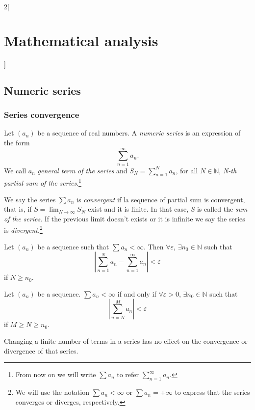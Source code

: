 \documentclass[class=article,crop=false]{standalone}
\begin{document}
\begin{multicols}{2}[\section{Mathematical analysis}]
\subsection{Numeric series}
\subsubsection{Series convergence}
\begin{definition}
Let $(a_n)$ be a sequence of real numbers. A \textit{numeric series} is an expression of the form $$\sum_{n=1}^\infty a_n.$$ We call $a_n$ \textit{general term of the series} and $\displaystyle S_N=\sum_{n=1}^N a_n$, for all $N\in\mathbb{N}$, \textit{N-th partial sum of the series}.\footnote{From now on we will write $\sum a_n$ to refer $\displaystyle\sum_{n=1}^\infty a_n$.}
\end{definition}
\begin{definition}
We say the series $\sum a_n$ is \textit{convergent} if la sequence of partial sum is convergent, that is, if $\displaystyle S=\lim_{N\to\infty}S_N$ exist and it is finite. In that case, $S$ is called the \textit{sum of the series}. If the previous limit doesn't exists or it is infinite we say the series is \textit{divergent}.\footnote{We will use the notation $\sum a_n<\infty$ or $\sum a_n=+\infty$ to express that the series converges or diverges, respectively.}
\end{definition}
\begin{prop}
Let $(a_n)$ be a sequence such that $\sum a_n<\infty$. Then $\forall\varepsilon$, $\exists n_0\in\mathbb{N}$ such that $$\left|\sum_{n=1}^N a_n-\sum_{n=1}^\infty a_n\right|<\varepsilon$$ if $N\geq n_0$.
\end{prop}
\begin{theorem}
Let $(a_n)$ be a sequence. $\sum a_n<\infty$ if and only if $\forall\varepsilon>0$, $\exists n_0\in\mathbb{N}$ such that $$\left|\sum_{n=N}^Ma_n\right|<\varepsilon$$ if $M\geq N\geq n_0$.
\end{theorem}
\begin{corollary}
Changing a finite number of terms in a series has no effect on the convergence or divergence of that series.
\end{corollary}
\begin{corollary}

\end{corollary}
\end{multicols}
\end{document}

